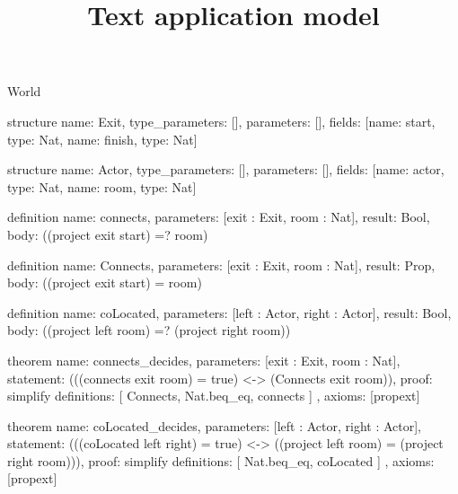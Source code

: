 \begin{lexlean}{World}
\title{Text application model}
\begin{semanticmodule}
structure{
  name: Exit,
  type_parameters: [],
  parameters: [],
  fields: [{name: start, type: Nat}, {name: finish, type: Nat}]
}

structure{
  name: Actor,
  type_parameters: [],
  parameters: [],
  fields: [{name: actor, type: Nat}, {name: room, type: Nat}]
}

definition{
  name: connects,
  parameters: [exit : Exit, room : Nat],
  result: Bool,
  body: ((project exit start) =? room)
}

definition{
  name: Connects,
  parameters: [exit : Exit, room : Nat],
  result: Prop,
  body: ((project exit start) = room)
}

definition{
  name: coLocated,
  parameters: [left : Actor, right : Actor],
  result: Bool,
  body: ((project left room) =? (project right room))
}

theorem{
  name: connects_decides,
  parameters: [exit : Exit, room : Nat],
  statement: (((connects exit room) = true) <-> (Connects exit room)),
  proof: simplify{
    definitions: [
      Connects,
      Nat.beq_eq,
      connects
    ]
  },
  axioms: [propext]
}

theorem{
  name: coLocated_decides,
  parameters: [left : Actor, right : Actor],
  statement: (((coLocated left right) = true) <-> ((project left room) = (project right room))),
  proof: simplify{
    definitions: [
      Nat.beq_eq,
      coLocated
    ]
  },
  axioms: [propext]
}
\end{semanticmodule}
\end{lexlean}
